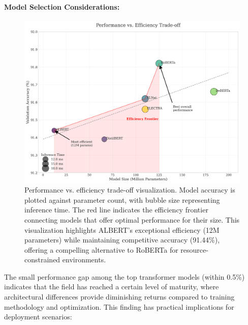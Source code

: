 \documentclass[12pt]{article}
\begin{document}
\paragraph{Model Selection Considerations:}
\begin{figure}[h]
    \centering
    \includegraphics[width=0.9\linewidth]{Figures/performance_efficiency_tradeoff.png}
    \caption{Performance vs. efficiency trade-off visualization. Model accuracy is plotted against parameter count, with bubble size representing inference time. The red line indicates the efficiency frontier connecting models that offer optimal performance for their size. This visualization highlights ALBERT's exceptional efficiency (12M parameters) while maintaining competitive accuracy (91.44\%), offering a compelling alternative to RoBERTa for resource-constrained environments.}
    \label{fig:efficiency_tradeoff}
\end{figure}

The small performance gap among the top transformer models (within 0.5\%) indicates that the field has reached a certain level of maturity, where architectural differences provide diminishing returns compared to training methodology and optimization. This finding has practical implications for deployment scenarios:
\end{document}
